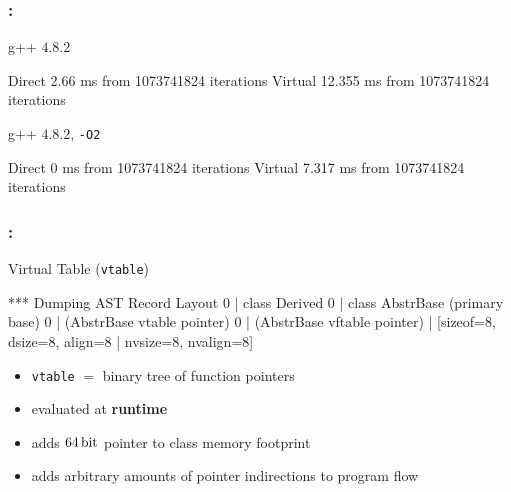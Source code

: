 \documentclass[9pt,xcolor=table]{beamer}
\begin{document}
\begin{frame}[fragile]
\frametitle{\insertsectionhead{}: \insertsubsectionhead{}}
\begin{block}{g++ $4.8.2$}
  \begin{semiverbatim}
    Direct          2.66 ms from 1073741824 iterations
    Virtual         12.355 ms from 1073741824 iterations
  \end{semiverbatim}
\end{block}
\pause
\begin{block}{g++ $4.8.2$, \texttt{-O2}}
  \begin{semiverbatim}
    Direct  	    0 ms from 1073741824 iterations 
    Virtual 	7.317 ms from 1073741824 iterations
  \end{semiverbatim}
\end{block}
\end{frame}


\begin{frame}[fragile]
\frametitle{\insertsectionhead{}: \insertsubsectionhead{}}
\begin{block}{Virtual Table (\texttt{vtable})}
  \begin{semiverbatim}
*** Dumping AST Record Layout
   0 | class Derived
   0 |   class AbstrBase (primary base)
   0 |     (AbstrBase vtable pointer)
   0 |     (AbstrBase vftable pointer)
     | [sizeof=8, dsize=8, align=8
     |  nvsize=8, nvalign=8]
  \end{semiverbatim}
\end{block}

\begin{itemize}
\item \texttt{vtable} $=$ binary tree of function pointers
\item evaluated at \textbf{runtime}
\item adds $\unit[64]{bit}$ pointer to class memory footprint
\item adds arbitrary amounts of pointer indirections to program flow
\end{itemize}

\end{frame}
\end{document}

